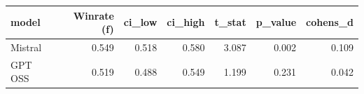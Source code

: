 \begin{tabular}{lrrrrrr}
\toprule
model & Winrate (f) & ci\_low & ci\_high & t\_stat & p\_value & cohens\_d \\
\midrule
Mistral & 0.549 & 0.518 & 0.580 & 3.087 & 0.002 & 0.109 \\
GPT OSS & 0.519 & 0.488 & 0.549 & 1.199 & 0.231 & 0.042 \\
\bottomrule
\end{tabular}
